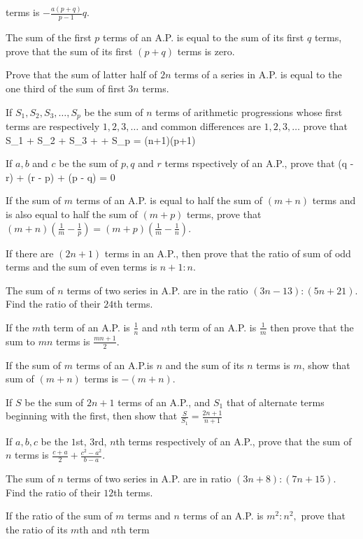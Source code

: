   terms is $-\frac{a(p + q)}{p - 1}q$.
\item The sum of the first $p$ terms of an A.P. is equal to the sum of its first $q$ terms, prove that the sum of its first $(p +
  q)$ terms is zero.
\item Prove that the sum of latter half of $2n$ terms of a series in A.P. is equal to the one third of the sum of first $3n$ terms.
\item If $S_1, S_2, S_3, \ldots, S_p$ be the sum of $n$ terms of arithmetic progressions whose first terms are respectively $1, 2,
  3, \ldots$ and common differences are $1, 2, 3, \ldots$ prove that \startformula S_1 + S_2 + S_3 + \cdots + S_p = (n+1)(p+1)\stopformula
\item If $a,b$ and $c$ be the sum of $p, q$ and $r$ terms rspectively of an A.P., prove that \startformula {}(q - r) + (r -
  p) + (p - q) = 0\stopformula
\item If the sum of $m$ terms of an A.P. is equal to half the sum of $(m + n)$ terms and is also equal to half the sum of $(m + p)$
  terms, prove that $(m + n)\left(\frac{1}{m} - \frac{1}{p}\right) = (m + p)\left(\frac{1}{m} - \frac{1}{n}\right)$.
\item If there are $(2n + 1)$ terms in an A.P., then prove that the ratio of sum of odd terms and the sum of even terms is $n + 1:
  n$.
\item The sum of $n$ terms of two series in A.P. are in the ratio $(3n - 13): (5n + 21)$. Find the ratio of their $24$th terms.
\item If the $m$th term of an A.P. is $\frac{1}{n}$ and $n$th term of an A.P. is $\frac{1}{m}$ then prove that the sum to $mn$
  terms is $\frac{mn + 1}{2}$.
\item If the sum of $m$ terms of an A.P.is $n$ and the sum of its $n$ terms is $m$, show that sum of $(m + n)$ terms is $-(m + n)$.
\item If $S$ be the sum of $2n + 1$ terms of an A.P., and $S_1$ that of alternate terms beginning with the first, then show that
  $\frac{S}{S_1} = \frac{2n + 1}{n + 1}$
\item If $a, b, c$ be the $1$st, $3$rd, $n$th terms respectively of an A.P., prove that the sum of $n$ terms is $\frac{c + a}{2} +
  \frac{c^2 - a^2}{b - a}$.
\item The sum of $n$ terms of two series in A.P. are in ratio $(3n + 8):(7n + 15)$. Find the ratio of their $12$th terms.
\item If the ratio of the sum of $m$ terms and $n$ terms of an A.P. is $m^2:n^2,$ prove that the ratio of its $m$th and $n$th term
